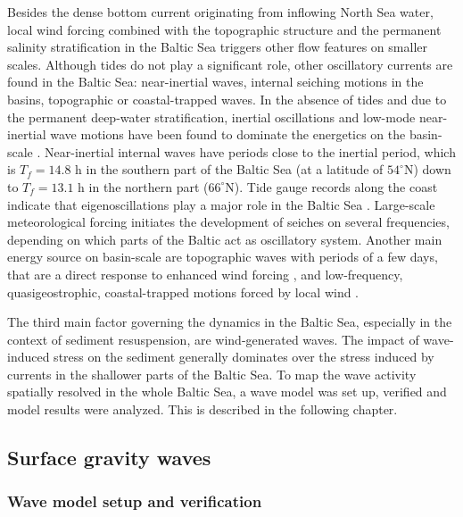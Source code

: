 Besides the dense bottom current originating from inflowing North Sea water, 
local wind forcing combined with the topographic structure and the permanent 
salinity stratification in the Baltic Sea triggers other flow features on 
smaller scales. Although tides do not play a significant role, other 
oscillatory currents are found in the Baltic Sea: near-inertial waves, internal 
seiching motions in the basins, topographic or coastal-trapped waves.
In the absence of tides and due to the permanent deep-water stratification, 
inertial oscillations and low-mode near-inertial wave motions have been found to 
dominate the energetics on the basin-scale \citep[][]{vanderlee2011}. 
Near-inertial internal waves have periods close to the inertial period, which is 
$T_f = 14.8$ h in the southern part of the Baltic Sea (at a latitude of 
$54^{\circ}$N) down to $T_f = 13.1$ h in the northern part ($66^{\circ}$N). 
Tide gauge records along the coast indicate that eigenoscillations play a 
major role in the Baltic Sea \citep[][]{wubber1979}. Large-scale meteorological 
forcing initiates the development of seiches on several frequencies, depending 
on which parts of the Baltic act as oscillatory system. 
 Another main energy source on basin-scale are topographic waves with periods 
of a few days, that are a direct response to enhanced wind forcing 
\citep[][]{holtermann2012}, and low-frequency, quasigeostrophic, 
coastal-trapped motions forced by local wind \citep[][]{pizarro1998}.

The third main factor governing the dynamics in the Baltic Sea, especially in 
the context of sediment resuspension, are wind-generated waves. The impact of 
wave-induced stress on the sediment generally dominates over the stress induced 
by currents \citep[][]{Grant1986} in the shallower parts of the Baltic Sea. To 
map the wave activity spatially resolved in the whole Baltic Sea, a wave model 
was set up, verified and model results were analyzed. This is described in the 
following chapter.

\subsection{Surface gravity waves}

\subsubsection{Wave model setup and verification}

